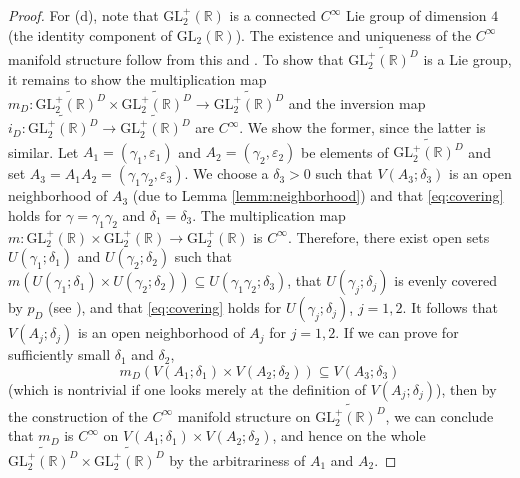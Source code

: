\documentclass[12pt]{amsart}
\numberwithin{equation}{section}
\theoremstyle{plain}
\theoremstyle{definition}
\theoremstyle{remark}
\newcommand\glR{\mathrm{GL}_2(\mathbb{R})}
\newcommand\glpR{\mathrm{GL}_2^{+}(\mathbb{R})}
\newcommand\Dcover[2]{\widetilde{#1^{#2}}}
\begin{document}
\begin{appendix}
\begin{proof}
For (d), note that $\glpR$ is a connected $C^\infty$ Lie group of dimension $4$ (the identity component of $\glR$). The existence and uniqueness of the $C^\infty$ manifold structure follow from this and \cite[Proposition 4.40]{Lee13}. To show that $\Dcover{\glpR}{D}$ is a Lie group, it remains to show the multiplication map $m_D\colon\Dcover{\glpR}{D}\times\Dcover{\glpR}{D}\rightarrow\Dcover{\glpR}{D}$ and the inversion map $i_D\colon\Dcover{\glpR}{D}\rightarrow\Dcover{\glpR}{D}$ are $C^\infty$. We show the former, since the latter is similar. Let $A_1=(\gamma_1,\varepsilon_1)$ and $A_2=(\gamma_2,\varepsilon_2)$ be elements of $\Dcover{\glpR}{D}$ and set $A_3=A_1A_2=(\gamma_1\gamma_2,\varepsilon_3)$. We choose a $\delta_3>0$ such that $V(A_3;\delta_3)$  is an open neighborhood of $A_3$ (due to Lemma \ref{lemm:neighborhood}) and that \eqref{eq:covering} holds for $\gamma=\gamma_1\gamma_2$ and $\delta_1=\delta_3$. The multiplication map $m\colon\glpR\times\glpR\rightarrow\glpR$ is $C^\infty$. Therefore, there exist open sets $U(\gamma_1;\delta_1)$ and $U(\gamma_2;\delta_2)$ such that $m(U(\gamma_1;\delta_1)\times U(\gamma_2;\delta_2))\subseteq U(\gamma_1\gamma_2;\delta_3)$, that $U(\gamma_j;\delta_j)$ is evenly covered by $p_D$ (see \cite[p. 278]{Lee11}), and that \eqref{eq:covering} holds for $U(\gamma_j;\delta_j)$, $j=1,2$. It follows that $V(A_j;\delta_j)$ is an open neighborhood of $A_j$ for $j=1,2$. If we can prove for sufficiently small $\delta_1$ and $\delta_2$,
\begin{equation}
\label{eq:mDinclusion}
m_D(V(A_1;\delta_1)\times V(A_2;\delta_2))\subseteq V(A_3;\delta_3)
\end{equation}
(which is nontrivial if one looks merely at the definition of $V(A_j;\delta_j)$), then by the construction of the $C^\infty$ manifold structure on $\Dcover{\glpR}{D}$, we can conclude that $m_D$ is $C^\infty$ on $V(A_1;\delta_1)\times V(A_2;\delta_2)$, and hence on the whole $\Dcover{\glpR}{D}\times\Dcover{\glpR}{D}$ by the arbitrariness of $A_1$ and $A_2$.


\end{proof}
\end{appendix}
\end{document}
